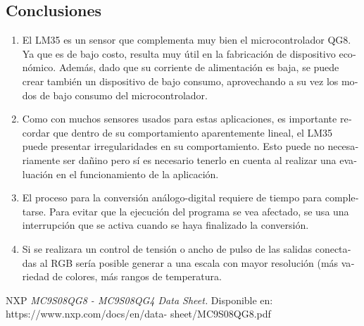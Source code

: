 \documentclass[journal]{IEEEtran}
\begin{document}
\begin{otherlanguage}{spanish}
\section{Conclusiones}
\begin{enumerate}
    \item El LM35 es un sensor que complementa muy bien el microcontrolador QG8. Ya que es de bajo costo, resulta muy útil en la fabricación de dispositivo económico. Además, dado que su corriente de alimentación es baja, se puede crear también un dispositivo de bajo consumo, aprovechando a su vez los modos de bajo consumo del microcontrolador.
    \item Como con muchos sensores usados para estas aplicaciones, es importante recordar que dentro de su comportamiento aparentemente lineal, el LM35 puede presentar irregularidades en su comportamiento. Esto puede no necesariamente ser dañino pero sí es necesario tenerlo en cuenta al realizar una evaluación en el funcionamiento de la aplicación.
    \item El proceso para la conversión análogo-digital requiere de tiempo para completarse. Para evitar que la ejecución del programa se vea afectado, se usa una interrupción que se activa cuando se haya finalizado la conversión.
    \item Si se realizara un control de  tensión o ancho de pulso de las salidas conectadas al RGB sería posible generar a una escala con mayor resolución (más variedad de colores, más rangos de temperatura.
\end{enumerate}

\begin{thebibliography}{1ente,5}
     NXP
    \textit{MC9S08QG8 - MC9S08QG4 Data Sheet.}
    Disponible en: https://www.nxp.com/docs/en/data- sheet/MC9S08QG8.pdf
 
\end{thebibliography}
\end{otherlanguage}
\end{document}
